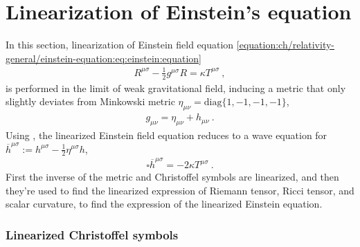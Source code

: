 \documentclass[letterpaper,10pt,english]{jupyterBook}
\begin{document}
\section{Linearization of Einstein’s equation}
\label{\detokenize{ch/relativity-general/linearized-efe:linearization-of-einstein-s-equation}}\label{\detokenize{ch/relativity-general/linearized-efe:relativity-general-notes-einstein-equation-linearization}}\label{\detokenize{ch/relativity-general/linearized-efe::doc}}
\sphinxAtStartPar
In this section, linearization of Einstein field equation \eqref{equation:ch/relativity-general/einstein-equation:eq:einstein:equation}
\begin{equation*}
\begin{split}R^{\mu \sigma} - \frac{1}{2} g^{\mu \sigma} R = \kappa T^{\mu \sigma} \ ,\end{split}
\end{equation*}
\sphinxAtStartPar
is performed in the limit of weak gravitational field, inducing a metric that only slightly deviates from Minkowski metric \(\eta_{\mu \nu} = \text{diag}\{ 1, -1, -1, -1\}\),
\begin{equation*}
\begin{split}g_{\mu \nu} = \eta_{\mu \nu} + h_{\mu \nu} \ .\end{split}
\end{equation*}
\sphinxAtStartPar
Using , the linearized Einstein field equation reduces to a wave equation for \(\overline{h}^{\mu \sigma} := h^{\mu \sigma} - \frac{1}{2} \eta^{\mu \sigma} h\),
\begin{equation}\label{equation:ch/relativity-general/linearized-efe:eq:efe-linearization:linearized-efe}
\begin{split}\square \overline{h}^{\mu \sigma} = - 2 \kappa T^{\mu \sigma} \ .\end{split}
\end{equation}
\sphinxAtStartPar
First the inverse of the metric and Christoffel symbols are linearized, and then they’re used to find the linearized expression of Riemann tensor, Ricci tensor, and scalar curvature, to find the expression of the linearized Einstein equation.
\subsubsection*{Linearized Christoffel symbols}
\end{document}

